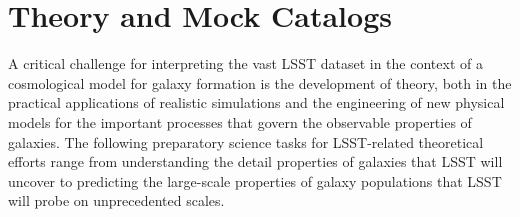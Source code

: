 \section{Theory and Mock Catalogs}\label{sec:tasks:tmc}  

A critical challenge for interpreting the vast LSST dataset
in the context of a cosmological model for galaxy formation
is the development of theory, both in the practical applications
of realistic simulations and the engineering of new physical
models for the important processes that govern the observable
properties of galaxies. The following preparatory science tasks 
for LSST-related theoretical efforts range from understanding the
detail properties of galaxies that LSST will uncover to predicting
the large-scale properties of galaxy populations that LSST will probe
on unprecedented scales.


